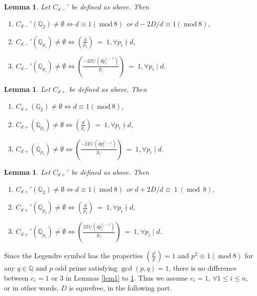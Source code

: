 \documentclass{amsart}
\numberwithin{equation}{section}
\theoremstyle{plain}
\newtheorem{lemma_}[equation]{Lemma}
\theoremstyle{definition}
\newcommand{\lemm}[1]{\begin{lemma_}#1\end{lemma_}}
\newcommand{\QQ}{\mathbb Q}
\renewcommand{\mod}[1]{\ \mathrm{mod}\ #1}  %
\begin{document}
\lemm{\label{lem2}
	Let $C_{d-}'$ be defined as above. Then\vspace{1.5ex}

\begin{enumerate}
\item[(1)] $C_{d-}'(\mathbb{Q}_2) \neq \emptyset \Leftrightarrow d  \equiv 1 ( \mod 8) \ \ or \ d - 2D/d\equiv 1 ( \mod 8)  $, \vspace{1ex}
\item[(2)] $C_{d-}'(\mathbb{Q}_{p_i}) \neq \emptyset \Leftrightarrow (\frac{d}{p_i}) \ =\ 1 , \forall p_i \nmid d$,
\item[(3)] $C_{d-}'(\mathbb{Q}_{p_i}) \neq \emptyset \Leftrightarrow (\frac{-2D/(dp_i^{e_i-1})}{p_i}) \ =\ 1 , \forall  p_i \mid d$.
\end{enumerate}
}

\lemm{\label{lem3}
Let $C_{d+}$ be defined as above. Then\vspace{1.5ex}

\begin{enumerate}
\item[(1)] $C_{d+}(\mathbb{Q}_2) \neq \emptyset \Leftrightarrow d  \equiv 1 (\mod 8)$, \vspace{1.5ex}
\item[(2)] $C_{d+}(\mathbb{Q}_{p_i}) \neq \emptyset \Leftrightarrow (\frac{d}{p_i}) \ =\ 1 , \forall p_i \nmid d$,
\item[(3)] $C_{d+}(\mathbb{Q}_{p_i}) \neq \emptyset \Leftrightarrow (\frac{-2D/(d p_i^{e^i-1})}{p_i}) \ =\ 1 , \forall  p_i \mid d$.
\end{enumerate}
}

\lemm{\label{lem4}
	Let $C_{d+}'$ be defined as above. Then\vspace{1.5ex}

\begin{enumerate}
\item[(1)] $C_{d+}'(\mathbb{Q}_2) \neq \emptyset \Leftrightarrow d \equiv 1( \mod 8) \ \ or \ d + 2D/d\equiv\ 1\ ( \mod\ 8)  $, \vspace{1ex}
\item[(2)] $C_{d+}'(\mathbb{Q}_{p_i}) \neq \emptyset \Leftrightarrow (\frac{d}{p_i}) \ =\ 1 , \forall p_i \nmid d$,
\item[(3)] $C_{d+}'(\mathbb{Q}_{p_i}) \neq \emptyset \Leftrightarrow (\frac{2D/(dp_i^{e_i-1})}{p_i}) \ =\ 1 , \forall  p_i \mid  d$.
\end{enumerate}
}
Since the Legendre symbol has the properties $(\frac{q^2}{p}) = 1$ and $p^2 \equiv 1 (\mod 8)$ for any $q \in \QQ$ and $p$ odd prime satisfying $\gcd (p,q) = 1$, there is no difference between $e_i = 1$ or $3$ in Lemmas \ref{lem1} to \ref{lem4}. Thus we assume $e_i = 1$, $\forall 1 \le i \le n$, or in other words, $D$ is squrefree, in the following part.
\end{document}
